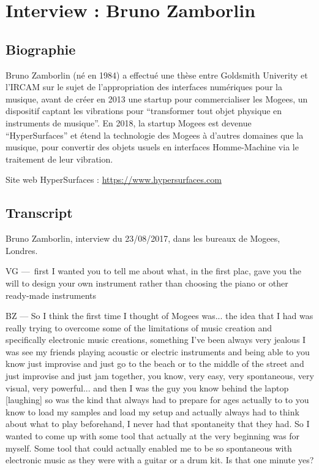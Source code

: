 \chapter{Interview : Bruno Zamborlin}
\label{appendix:zamborlin}

\section*{Biographie}

\noindent Bruno Zamborlin (né en 1984) a effectué une thèse entre Goldsmith Univerity et l'IRCAM sur le sujet de l'appropriation des interfaces numériques pour la musique, avant de créer en 2013 une startup pour commercialiser les Mogees, un dispositif captant les vibrations pour ``transformer tout objet physique en instruments de musique''. En 2018, la startup Mogees est devenue ``HyperSurfaces'' et étend la technologie des Mogees à d'autres domaines que la musique, pour convertir des objets usuels en interfaces Homme-Machine via le traitement de leur vibration.

\noindent Site web HyperSurfaces : \url{https://www.hypersurfaces.com}

\section*{Transcript}

\noindent Bruno Zamborlin, interview du 23/08/2017, dans les bureaux de Mogees, Londres.

VG — first I wanted you to tell me about what, in the first plac, gave you the will to design your own instrument rather than choosing the piano or other ready-made instruments 

BZ — So I think the first time I thought of Mogees was... the idea that I had was really trying to overcome some of the limitations of music creation and specifically electronic music creations, something I've been always very jealous I was see my friends playing acoustic or electric instruments and being able to you know just improvise and just go to the beach or to the middle of the street and just improvise and just jam together, you know, very easy, very spontaneous, very visual, very powerful... and then I was the guy you know behind the laptop [laughing] so was the kind that always had to prepare for ages actually to to you know to load my samples and load my setup and actually always had to think about what to play beforehand, I never had that spontaneity that they had. So I wanted to come up with some tool that actually at the very beginning was for myself. Some tool that could actually enabled me to be so spontaneous with electronic music as they were with a guitar or a drum kit. Is that one minute yes? 


